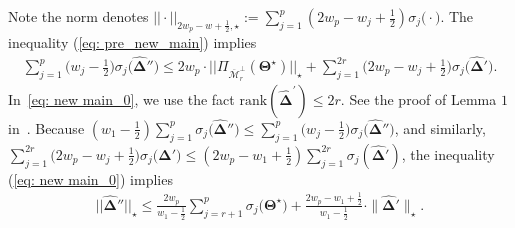 \documentclass[alpha-refs]{wiley-article}
\begin{document}
Note the norm denotes $ ||\cdot||_{2w_{p} - w + \frac{1}{2}, \star} := \sum^{p}_{j = 1} (2w_{p}-w_{j}+\frac{1}{2}) \sigma_{j}\big(\cdot\big)$.
The inequality (\ref{eq: pre_new_main}) implies
\begin{eqnarray} \label{eq: new main_0}
    \sum^{p}_{j = 1}\bigg(w_{j} - \frac{1}{2}\bigg)\sigma_{j}\big(\boldsymbol{\widehat{\Delta}}''\big) \leq  2w_{p} \cdot ||\Pi_{\overline{\mathcal{M}}_{r}^{\perp}}(\boldsymbol{\Theta^{\star}})||_{\star} + \sum^{2r}_{j = 1} \bigg(2w_{p}-w_{j} + \frac{1}{2} \bigg) \sigma_{j}\big(\boldsymbol{\widehat{\Delta}}'\big).
\end{eqnarray}
In~\eqref{eq: new main_0}, we use the fact $\text{rank}(\boldsymbol{\widehat{\Delta}}^{'}) \leq 2r$.
See the proof of Lemma $1$ in~\cite{negahban2011estimation}.
Because  $(w_{1} - \frac{1}{2})\sum^{p}_{j = 1}\sigma_{j}\big(\boldsymbol{\widehat{\Delta}}''\big) \leq \sum^{p}_{j = 1}\big(w_{j} - \frac{1}{2}\big)\sigma_{j}\big(\boldsymbol{\widehat{\Delta}}''\big)$, and similarly, $\sum^{2r}_{j = 1}\big(2w_{p} - w_{j} +  \frac{1}{2}\big)\sigma_{j}\big(\boldsymbol{\widehat{\Delta}}'\big)\leq (2w_{p}-w_{1}+\frac{1}{2})\sum_{j=1}^{2r}\sigma_{j}(\boldsymbol{\widehat{\Delta}}')$,
the inequality (\ref{eq: new main_0}) implies 
\begin{align}
    ||\boldsymbol{\widehat{\Delta}}''||_{\star} \leq \frac{2w_{p}}{w_{1}-\frac{1}{2}} \sum_{j=r+1}^{p}\sigma_{j}\big(\boldsymbol{\Theta^{\star}}\big) 
    + \frac{2w_{p}-w_{1}+\frac{1}{2}}{w_{1}-\frac{1}{2}}\cdot \| \boldsymbol{\widehat{\Delta}}' \|_{\star}.
    \label{eq: new main_1}
\end{align}
\end{document}
